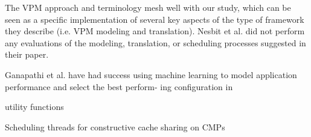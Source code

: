 The VPM approach and terminology mesh well with our study, which can be seen as a specific implementation of several key aspects of the type of framework they describe (i.e. VPM modeling and translation). Nesbit et al. did not perform any evaluations of the modeling, translation, or scheduling processes suggested in their paper.

\cite{aiken-mspc06}
\cite{1006707}
\cite{genbrugge-isca07}
\cite{merkel-eurosys08}

Ganapathi et al. have had success using machine learning to model application performance and select the best perform- ing configuration in \cite{Archana}

\cite{unc}

\cite{1078411}
utility functions

\cite{1380585,975344,wasserman-book}


Scheduling threads for constructive cache sharing on CMPs
\cite{1248396}
